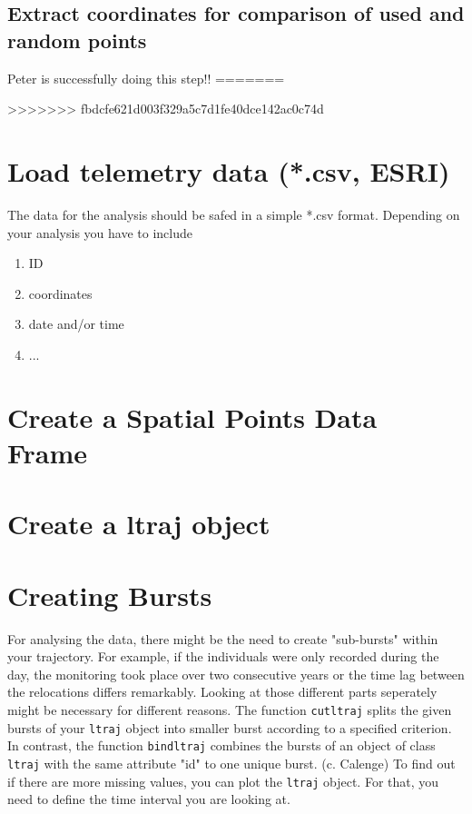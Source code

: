 \documentclass[11pt, a4paper]{article}\usepackage[]{graphicx}\usepackage[]{color}
\begin{document}
\subsection{Extract coordinates for comparison of used and random points} %
Peter is successfully doing this step!!
=======


>>>>>>> fbdcfe621d003f329a5c7d1fe40dce142ac0c74d

\section{Load telemetry data (*.csv, ESRI)}%
The data for the analysis should be safed in a simple *.csv format. Depending on your analysis you have to include 
\begin{enumerate}
\item{ID}
\item{coordinates}
\item{date and/or time}
\item{...}
\end{enumerate}



\section{Create a Spatial Points Data Frame}%

\section{Create a ltraj object}%


\section{Creating Bursts}%

For analysing the data, there might be the need to create "sub-bursts" within your trajectory. For example, if the individuals were only recorded during the day, the monitoring took place over two consecutive years or the time lag between the relocations differs remarkably. Looking at those different parts seperately might be necessary for different reasons. The function \texttt{cutltraj} splits the given bursts of your \texttt{ltraj} object into smaller burst according to a specified criterion. In contrast, the function \texttt{bindltraj} combines the bursts of an object of class \texttt{ltraj} with the same attribute "id" to one unique burst. (c. Calenge) To find out if there are more missing values, you can plot the \texttt{ltraj} object. For that, you need to define the time interval you are looking at. 
\end{document}
